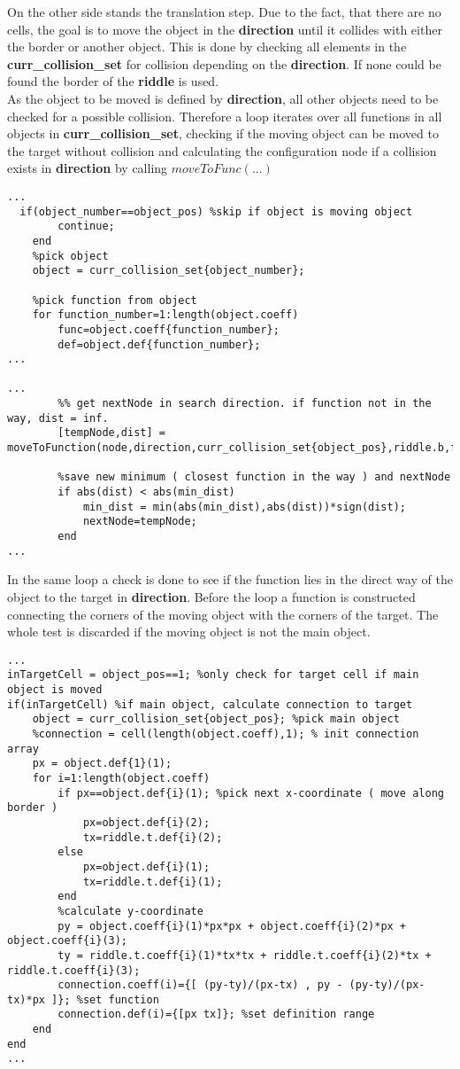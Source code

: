 On the other side stands the translation step. Due to the fact, that there are no cells, the goal is to move the object in the \textbf{direction} until it collides with either the border or another object. This is done by checking all elements in the \textbf{curr\_collision\_set} for collision depending on the \textbf{direction}. If none could be found the border of the \textbf{riddle} is used.\\
As the object to be moved is defined by \textbf{direction}, all other objects need to be checked for a possible collision. Therefore a loop iterates over all functions in all objects in \textbf{curr\_collision\_set}, checking if the moving object can be moved to the target without collision and calculating the configuration node if a collision exists in \textbf{direction} by calling $moveToFunc(...)$
 \begin{lstlisting}
...
  if(object_number==object_pos) %skip if object is moving object
        continue;
    end
    %pick object
    object = curr_collision_set{object_number};    

    %pick function from object
    for function_number=1:length(object.coeff)
        func=object.coeff{function_number};
        def=object.def{function_number};
...  
        
...
        %% get nextNode in search direction. if function not in the way, dist = inf.
        [tempNode,dist] = moveToFunction(node,direction,curr_collision_set{object_pos},riddle.b,func,def,object.above{function_number});
        
        %save new minimum ( closest function in the way ) and nextNode
        if abs(dist) < abs(min_dist)
            min_dist = min(abs(min_dist),abs(dist))*sign(dist);
            nextNode=tempNode;
        end
...
\end{lstlisting}
In the same loop a check is done to see if the function lies in the direct way of the object to the target in \textbf{direction}. Before the loop a function is constructed connecting the corners of the moving object with the corners of the target. The whole test is discarded if the moving object is not the main object.
\begin{lstlisting}
...
inTargetCell = object_pos==1; %only check for target cell if main object is moved
if(inTargetCell) %if main object, calculate connection to target
    object = curr_collision_set{object_pos}; %pick main object
    %connection = cell(length(object.coeff),1); % init connection array
    px = object.def{1}(1);
    for i=1:length(object.coeff)
        if px==object.def{i}(1); %pick next x-coordinate ( move along border )
            px=object.def{i}(2);
            tx=riddle.t.def{i}(2);
        else
            px=object.def{i}(1);
            tx=riddle.t.def{i}(1);
        end
        %calculate y-coordinate
        py = object.coeff{i}(1)*px*px + object.coeff{i}(2)*px + object.coeff{i}(3);
        ty = riddle.t.coeff{i}(1)*tx*tx + riddle.t.coeff{i}(2)*tx + riddle.t.coeff{i}(3);
        connection.coeff(i)={[ (py-ty)/(px-tx) , py - (py-ty)/(px-tx)*px ]}; %set function
        connection.def(i)={[px tx]}; %set definition range
    end
end
...
\end{lstlisting}
